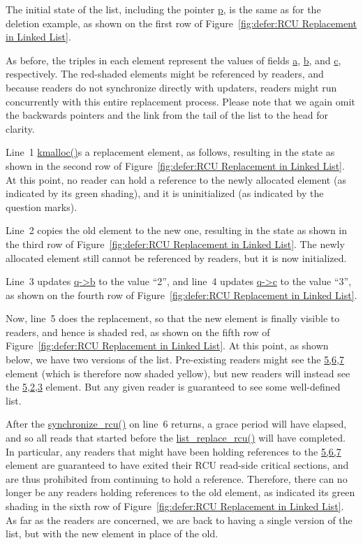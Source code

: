 The initial state of the list, including the pointer \url{p},
is the same as for the deletion example, as shown on the
first row of
Figure~\ref{fig:defer:RCU Replacement in Linked List}.

As before,
the triples in each element represent the values of fields \url{a},
\url{b}, and \url{c}, respectively.
The red-shaded elements might be referenced by readers,
and because readers do not synchronize directly with updaters,
readers might run concurrently with this entire replacement process.
Please note that
we again omit the backwards pointers and the link from the tail
of the list to the head for clarity.

Line~1 \url{kmalloc()}s a replacement element, as follows,
resulting in the state as shown in the second row of
Figure~\ref{fig:defer:RCU Replacement in Linked List}.
At this point, no reader can hold a reference to the newly allocated
element (as indicated by its green shading), and it is uninitialized
(as indicated by the question marks).

Line~2 copies the old element to the new one, resulting in the
state as shown in the third row of
Figure~\ref{fig:defer:RCU Replacement in Linked List}.
The newly allocated element still cannot be referenced by readers, but
it is now initialized.

Line~3 updates \url{q->b} to the value ``2'', and
line~4 updates \url{q->c} to the value ``3'', as shown on the fourth row of
Figure~\ref{fig:defer:RCU Replacement in Linked List}.

Now, line~5 does the replacement, so that the new element is
finally visible to readers, and hence is shaded red, as shown on
the fifth row of
Figure~\ref{fig:defer:RCU Replacement in Linked List}.
At this point, as shown below, we have two versions of the list.
Pre-existing readers might see the \url{5,6,7} element (which is
therefore now shaded yellow), but
new readers will instead see the \url{5,2,3} element.
But any given reader is guaranteed to see some well-defined list.

After the \url{synchronize_rcu()} on line~6 returns,
a grace period will have elapsed, and so all reads that started before the
\url{list_replace_rcu()} will have completed.
In particular, any readers that might have been holding references
to the \url{5,6,7} element are guaranteed to have exited
their RCU read-side critical sections, and are thus prohibited from
continuing to hold a reference.
Therefore, there can no longer be any readers holding references
to the old element, as indicated its green shading in the sixth row of
Figure~\ref{fig:defer:RCU Replacement in Linked List}.
As far as the readers are concerned, we are back to having a single version
of the list, but with the new element in place of the old.

